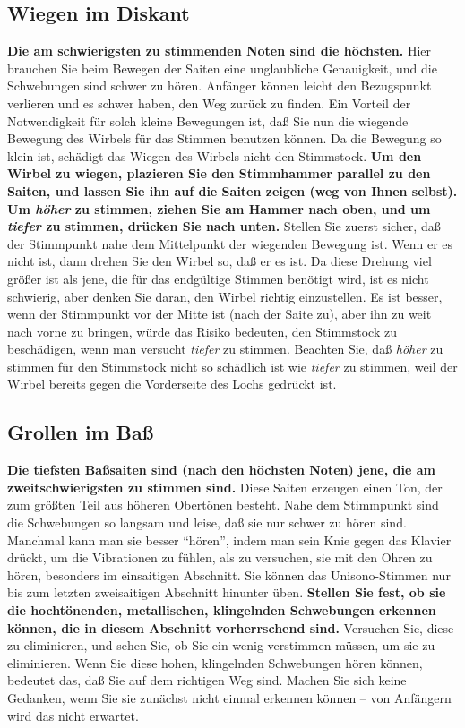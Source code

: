 \subsection{Wiegen im Diskant}
\label{c2_5_disk}

\textbf{Die am schwierigsten zu stimmenden Noten sind die höchsten.}
Hier brauchen Sie beim Bewegen der Saiten eine unglaubliche Genauigkeit, und die Schwebungen sind schwer zu hören.
Anfänger können leicht den Bezugspunkt verlieren und es schwer haben, den Weg zurück zu finden.
Ein Vorteil der Notwendigkeit für solch kleine Bewegungen ist, daß Sie nun die wiegende Bewegung des Wirbels für das Stimmen benutzen können.
Da die Bewegung so klein ist, schädigt das Wiegen des Wirbels nicht den Stimmstock.
\textbf{Um den Wirbel zu wiegen, plazieren Sie den Stimmhammer parallel zu den Saiten, und lassen Sie ihn auf die Saiten zeigen (weg von Ihnen selbst).
Um \textit{höher} zu stimmen, ziehen Sie am Hammer nach oben, und um \textit{tiefer} zu stimmen, drücken Sie nach unten.}
Stellen Sie zuerst sicher, daß der Stimmpunkt nahe dem Mittelpunkt der wiegenden Bewegung ist.
Wenn er es nicht ist, dann drehen Sie den Wirbel so, daß er es ist.
Da diese Drehung viel größer ist als jene, die für das endgültige Stimmen benötigt wird, ist es nicht schwierig, aber denken Sie daran, den Wirbel richtig einzustellen.
Es ist besser, wenn der Stimmpunkt vor der Mitte ist (nach der Saite zu), aber ihn zu weit nach vorne zu bringen, würde das Risiko bedeuten, den Stimmstock zu beschädigen, wenn man versucht \textit{tiefer} zu stimmen.
Beachten Sie, daß \textit{höher} zu stimmen für den Stimmstock nicht so schädlich ist wie \textit{tiefer} zu stimmen, weil der Wirbel bereits gegen die Vorderseite des Lochs gedrückt ist.
 

\label{c2_5i}
\subsection{Grollen im Baß}
\label{c2_5_bass}

\textbf{Die tiefsten Baßsaiten sind (nach den höchsten Noten) jene, die am zweitschwierigsten zu stimmen sind.}
Diese Saiten erzeugen einen Ton, der zum größten Teil aus höheren Obertönen besteht.
Nahe dem Stimmpunkt sind die Schwebungen so langsam und leise, daß sie nur schwer zu hören sind.
Manchmal kann man sie besser \enquote{hören}, indem man sein Knie gegen das Klavier drückt, um die Vibrationen zu fühlen, als zu versuchen, sie mit den Ohren zu hören, besonders im einsaitigen Abschnitt.
Sie können das Unisono-Stimmen nur bis zum letzten zweisaitigen Abschnitt hinunter üben.
\textbf{Stellen Sie fest, ob sie die hochtönenden, metallischen, klingelnden Schwebungen erkennen können, die in diesem Abschnitt vorherrschend sind.}
Versuchen Sie, diese zu eliminieren, und sehen Sie, ob Sie ein wenig verstimmen müssen, um sie zu eliminieren.
Wenn Sie diese hohen, klingelnden Schwebungen hören können, bedeutet das, daß Sie auf dem richtigen Weg sind.
Machen Sie sich keine Gedanken, wenn Sie sie zunächst nicht einmal erkennen können -- von Anfängern wird das nicht erwartet.
 

